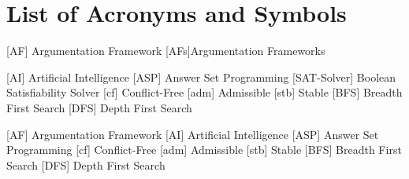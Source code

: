 \chapter*{List of Acronyms and Symbols}


 [AF] {Argumentation Framework}
[AFs]{Argumentation Frameworks}

 [AI] {Artificial Intelligence}
 [ASP] {Answer Set Programming}
 [SAT-Solver] {Boolean Satisfiability Solver}
 [cf] {Conflict-Free}
 [adm] {Admissible}
 [stb] {Stable}
 [BFS] {Breadth First Search}
 [DFS] {Depth First Search}


\begin{acronym}[ICANN]
     [AF] {Argumentation Framework}
     [AI] {Artificial Intelligence}
     [ASP] {Answer Set Programming}
     [cf] {Conflict-Free}
     [adm] {Admissible}
     [stb] {Stable}
     [BFS] {Breadth First Search}
     [DFS] {Depth First Search}
\end{acronym}